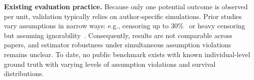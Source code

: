 \documentclass{article} %
\begin{document}
\textbf{Existing evaluation practice.}
Because only one potential outcome is observed per unit, validation typically relies on author-specific simulations. Prior studies vary assumptions in narrow ways: e.g., censoring up to 30\%~\citep{bo2024ameta} or heavy censoring but assuming ignorability~\citep{meir2025heterogeneous}.  
Consequently, results are not comparable across papers, and estimator robustness under simultaneous assumption violations remains unclear.
To date, no public benchmark exists with known individual-level ground truth with varying levels of assumption violations and survival distributions. %
\end{document}

